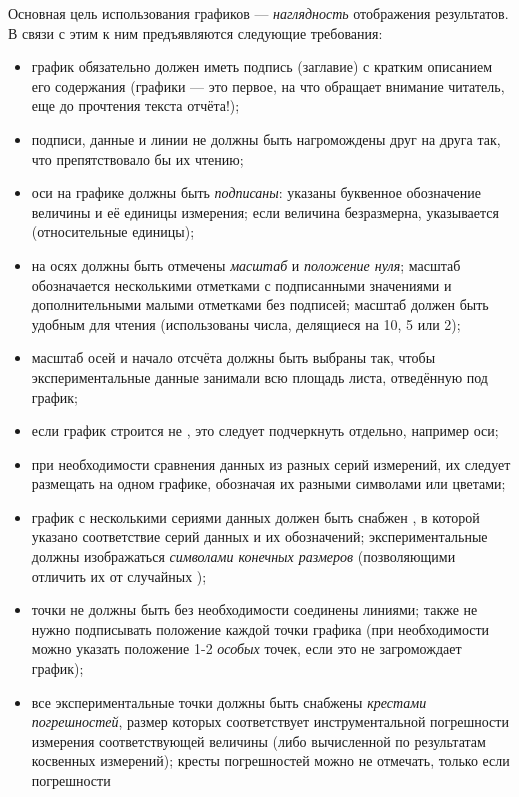 Основная цель использования графиков --- \emph{наглядность}
отображения результатов. В связи с этим к ним
предъявляются следующие требования:
\begin{itemize}
    \item график обязательно должен иметь подпись (заглавие) с кратким описанием его
содержания (графики --- это первое, на что обращает внимание читатель, еще до прочтения текста отчёта!);
\item подписи, данные и линии не должны быть нагромождены друг на друга
так, что препятствовало бы их чтению;
    \item оси на графике должны быть \emph{подписаны}: указаны буквенное
обозначение
величины и её единицы измерения; если величина безразмерна, указывается
 (относительные единицы);
    \item на осях должны быть отмечены \emph{масштаб} и \emph{положение нуля};
масштаб обозначается несколькими отметками с подписанными значениями
и дополнительными малыми отметками без подписей; масштаб должен быть
удобным для чтения (использованы 
числа, делящиеся на 10, 5 или 2);
    \item масштаб осей и начало отсчёта должны быть выбраны так, чтобы
экспериментальные
данные занимали всю площадь листа, отведённую под график;
    \item если график строится не , это
следует подчеркнуть отдельно, например 
оси;
    \item при необходимости сравнения данных из разных серий измерений, их
следует
размещать на одном графике, обозначая их разными символами или цветами;
    \item график с несколькими сериями данных должен быть снабжен ,
в которой указано соответствие серий данных и их обозначений; экспериментальные
 должны изображаться \emph{символами
конечных размеров} (позволяющими отличить их от случайных );
    \item точки не должны быть без необходимости соединены линиями; также не
нужно подписывать положение каждой точки графика (при необходимости
можно указать положение 1-2 \emph{особых} точек, если это не загромождает
график);
    \item все экспериментальные точки должны быть снабжены \emph{крестами
погрешностей},
размер которых соответствует инструментальной погрешности измерения
соответствующей величины (либо вычисленной по результатам косвенных
измерений); кресты погрешностей можно не отмечать, только если погрешности

\end{itemize}
